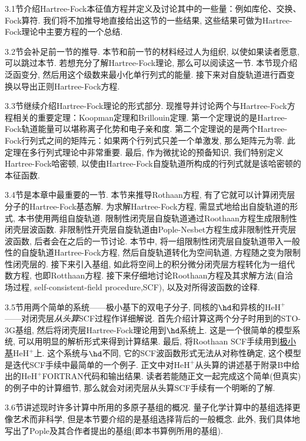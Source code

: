 3.1节介绍Hartree-Fock本征值方程并定义及讨论其中的一些量：例如库伦、交换、Fock算符. 我们将不加推导地直接给出这节的一些结果, 这些结果可做为Hartree-Fock理论中主要方程的一个总结.

3.2节会补足前一节的推导. 本节和前一节的材料经过人为组织, 以使如果读者愿意, 可以跳过本节. 若想充分了解Hartree-Fock理论, 那么可以阅读这一节. 本节现介绍泛函变分, 然后用这个级数来最小化单行列式的能量. 接下来对自旋轨道进行酉变换以导出正则Hartree-Fock方程.

3.3节继续介绍Hartree-Fock理论的形式部分. 现推导并讨论两个与Hartree-Fock方程相关的重要定理：Koopman定理和Brillouin定理. 第一个定理说的是Hartree-Fock轨道能量可以堪称离子化势和电子亲和度. 第二个定理说的是两个Hartree-Fock行列式之间的矩阵元：如果两个行列式只差一个单激发, 那么矩阵元为零. 此定理在多行列式理论中非常重要. 最后, 作为微扰论的预备知识, 我们特别定义Hartree-Fock哈密顿, 以使由Hartree-Fock自旋轨道所构成的行列式就是该哈密顿的本征函数.

3.4节是本章中最重要的一节. 本节来推导Rothaan方程, 有了它就可以计算闭壳层分子的Hartree-Fock基态解. 为求解Hartree-Fock方程, 需显式地给出自旋轨道的形式, 本书使用两组自旋轨道. 限制性闭壳层自旋轨道通过Roothaan方程生成限制性闭壳层波函数. 非限制性开壳层自旋轨道由Pople-Nesbet方程生成非限制性开壳层波函数, 后者会在之后的一节讨论. 本节中, 将一组限制性闭壳层自旋轨道带入一般性的自旋轨道Hartree-Fock方程, 然后自旋轨道转化为空间轨道, 方程随之变为限制性闭壳层的. 接下来引入基组, 如此将空间上的积分微分闭壳层\hft 方程转化为一组代数方程, 也即Rotthaan方程. 接下来仔细地讨论Roothaan方程及其求解方法(自洽场过程, self-consistent-field procedure,SCF), 以及对所得波函数的诠释.

3.5节用两个简单的系统——极小基下的双电子分子, 同核的$\hd$和异核的$\mathrm{HeH}^+$——对闭壳层\emph{从头算}SCF过程作详细解说. 首先介绍计算这两个分子时用到的STO-3G基组, 然后将闭壳层Hartree-Fock理论用到$\hd$系统上. 这是一个很简单的模型系统, 可以用明显的解析形式来得到计算结果. 最后, 将Roothaan SCF手续用到\underline{极小基$\mathrm{HeH}^+$}上. 这个系统与$\hd$不同, 它的SCF波函数形式无法从对称性确定, 这个模型是迭代SCF手续中最简单的一个例子. 正文中对$\mathrm{HeH}^+$从头算的讲述基于附录B中给出的$\mathrm{HeH}^+$FORTRAN代码和输出结果. 读者若能随正文一起完成这个简单(但真实)的例子中的计算细节, 那么就会对闭壳层从头算SCF手续有一个明晰的了解.

3.6节讲述现时许多计算中所用的多原子基组的概况. 量子化学计算中的基组选择更像艺术而非科学, 但是本节要介绍的是基组选择背后的一般概念. 此外, 我们具体地写出了Pople及其合作者提出的基组(即本书算例所用的基组).  

